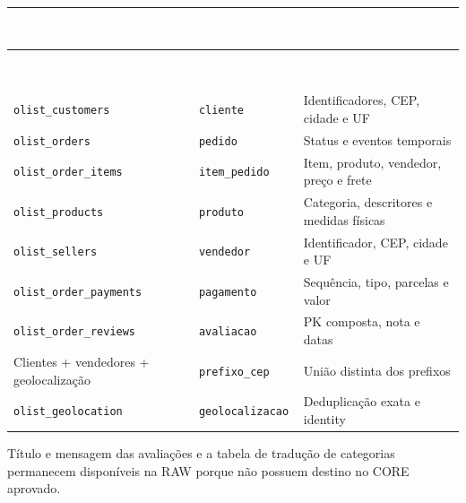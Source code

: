 \documentclass[12pt,a4paper]{article}
\begin{document}
	{\small
		\renewcommand{\arraystretch}{1.2}
		\begin{longtable}{
				|>{\raggedright\arraybackslash}p{5.3cm}|
				>{\raggedright\arraybackslash}p{3.5cm}|
				>{\raggedright\arraybackslash}p{5.8cm}|
			}
			\hline
			\rowcolor{AzulCorporativo}
			\textcolor{white}{\textbf{Origem}} &
			\textcolor{white}{\textbf{Destino CORE}} &
			\textcolor{white}{\textbf{Tratamento principal}} \\\hline
			\endfirsthead
			
			\hline
			\rowcolor{AzulCorporativo}
			\textcolor{white}{\textbf{Origem}} &
			\textcolor{white}{\textbf{Destino CORE}} &
			\textcolor{white}{\textbf{Tratamento principal}} \\\hline
			\endhead
			
			\texttt{olist\_customers} & \texttt{cliente} &
			Identificadores, CEP, cidade e UF \\\hline
			
			\texttt{olist\_orders} & \texttt{pedido} &
			Status e eventos temporais \\\hline
			
			\texttt{olist\_order\_items} & \texttt{item\_pedido} &
			Item, produto, vendedor, preço e frete \\\hline
			
			\texttt{olist\_products} & \texttt{produto} &
			Categoria, descritores e medidas físicas \\\hline
			
			\texttt{olist\_sellers} & \texttt{vendedor} &
			Identificador, CEP, cidade e UF \\\hline
			
			\texttt{olist\_order\_payments} & \texttt{pagamento} &
			Sequência, tipo, parcelas e valor \\\hline
			
			\texttt{olist\_order\_reviews} & \texttt{avaliacao} &
			PK composta, nota e datas \\\hline
			
			Clientes + vendedores + geolocalização & \texttt{prefixo\_cep} &
			União distinta dos prefixos \\\hline
			
			\texttt{olist\_geolocation} & \texttt{geolocalizacao} &
			Deduplicação exata e identity \\\hline
		\end{longtable}
	}
	
	Título e mensagem das avaliações e a tabela de tradução de categorias
	permanecem disponíveis na RAW porque não possuem destino no CORE aprovado.
	
\end{document}
